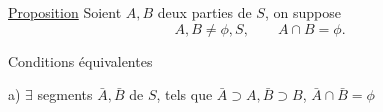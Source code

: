 \uline{Proposition} Soient $A,B$ deux parties  de $S$, on suppose 
\[
 A,B\ne\phi,S,\qquad A\cap B=\phi.
\]

Conditions équivalentes


a) $\exists$ segments $\bar A,\bar B$ de $S$, tels que $\bar A\supset A,\bar B\supset B$, $\bar A\cap\bar B=\phi$
